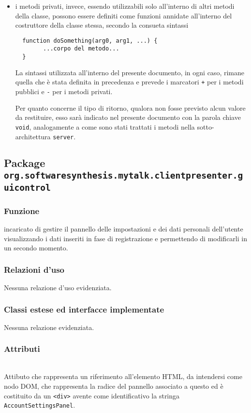 \begin{description}
\begin{itemize}
\item i metodi privati, invece, essendo utilizzabili solo all'interno di altri metodi della classe, possono essere definiti come funzioni annidate all'interno del costruttore della classe stessa, secondo la consueta sintassi
\begin{verbatim}
  function doSomething(arg0, arg1, ...) {
        ...corpo del metodo...
  }
\end{verbatim}

La sintassi utilizzata all'interno del presente documento, in ogni caso, rimane quella che è stata definita in precedenza e prevede i marcatori \verb|+| per i metodi pubblici e \verb|-| per i metodi privati.

Per quanto concerne il tipo di ritorno, qualora non fosse previsto alcun valore da restituire, esso sarà indicato nel presente documento con la parola chiave \texttt{void}, analogamente a come sono stati trattati i metodi nella sotto-architettura \texttt{server}.
	\end{itemize}
\end{description}

\subsection{Package \texttt{org.softwaresynthesis.mytalk.clientpresenter.guicontrol}}\label{sec:guicontrol}

\subsubsection*{Funzione}
 incaricato di gestire il pannello delle impostazioni e dei dati personali dell'utente visualizzando i dati inseriti in fase di registrazione e permettendo di modificarli in un secondo momento.

\subsubsection*{Relazioni d'uso}
Nessuna relazione d'uso evidenziata.

\subsubsection*{Classi estese ed interfacce implementate}
Nessuna relazione evidenziata.

\subsubsection*{Attributi}
\begin{description}
\item{}\\
Attibuto che rappresenta un riferimento all'elemento HTML, da intendersi come nodo DOM, che rappresenta la radice del pannello associato a questo  ed è costituito da un \verb'<div>' avente come identificativo la stringa \verb'AccountSettingsPanel'.
\end{description}

